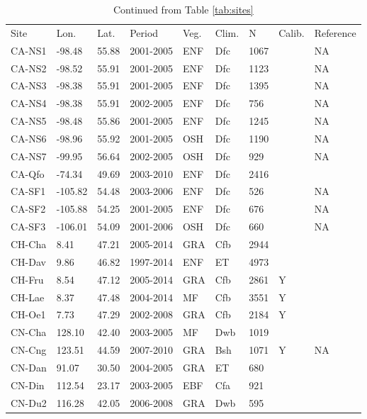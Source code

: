 \documentclass[gmd, manuscript]{copernicus}
\begin{document}
\begin{table}[t]
\caption{Continued from Table \ref{tab:sites}} 
\begin{tabular}{lllllllll}
  \tophline
  Site & Lon. & Lat. & Period & Veg. & Clim. & N & Calib. & Reference \\ 
  \middlehline  
  CA-NS1 & -98.48 & 55.88 & 2001-2005 & ENF & Dfc & 1067 &  & NA \\ 
  CA-NS2 & -98.52 & 55.91 & 2001-2005 & ENF & Dfc & 1123 &  & NA \\ 
  CA-NS3 & -98.38 & 55.91 & 2001-2005 & ENF & Dfc & 1395 &  & NA \\ 
  CA-NS4 & -98.38 & 55.91 & 2002-2005 & ENF & Dfc & 756 &  & NA \\ 
  CA-NS5 & -98.48 & 55.86 & 2001-2005 & ENF & Dfc & 1245 &  & NA \\ 
  CA-NS6 & -98.96 & 55.92 & 2001-2005 & OSH & Dfc & 1190 &  & NA \\ 
  CA-NS7 & -99.95 & 56.64 & 2002-2005 & OSH & Dfc & 929 &  & NA \\ 
  CA-Qfo & -74.34 & 49.69 & 2003-2010 & ENF & Dfc & 2416 &  & \citet{CA-Qfo} \\ 
  CA-SF1 & -105.82 & 54.48 & 2003-2006 & ENF & Dfc & 526 &  & NA \\ 
  CA-SF2 & -105.88 & 54.25 & 2001-2005 & ENF & Dfc & 676 &  & NA \\ 
  CA-SF3 & -106.01 & 54.09 & 2001-2006 & OSH & Dfc & 660 &  & NA \\ 
  CH-Cha & 8.41 & 47.21 & 2005-2014 & GRA & Cfb & 2944 &  & \citet{CH-Cha} \\ 
  CH-Dav & 9.86 & 46.82 & 1997-2014 & ENF & ET & 4973 &  & \citet{CH-Dav} \\ 
  CH-Fru & 8.54 & 47.12 & 2005-2014 & GRA & Cfb & 2861 & Y & \citet{CH-Fru} \\ 
  CH-Lae & 8.37 & 47.48 & 2004-2014 & MF & Cfb & 3551 & Y & \citet{CH-Lae} \\ 
  CH-Oe1 & 7.73 & 47.29 & 2002-2008 & GRA & Cfb & 2184 & Y & \citet{CH-Oe1} \\ 
  CN-Cha & 128.10 & 42.40 & 2003-2005 & MF & Dwb & 1019 &  & \citet{CN-Cha} \\ 
  CN-Cng & 123.51 & 44.59 & 2007-2010 & GRA & Bsh & 1071 & Y & NA \\ 
  CN-Dan & 91.07 & 30.50 & 2004-2005 & GRA & ET & 680 &  & \citet{CN-Dan} \\ 
  CN-Din & 112.54 & 23.17 & 2003-2005 & EBF & Cfa & 921 &  & \citet{CN-Din} \\ 
  CN-Du2 & 116.28 & 42.05 & 2006-2008 & GRA & Dwb & 595 &  & \citet{CN-Du2} \\ 

\end{tabular}
\end{table}
\end{document}
